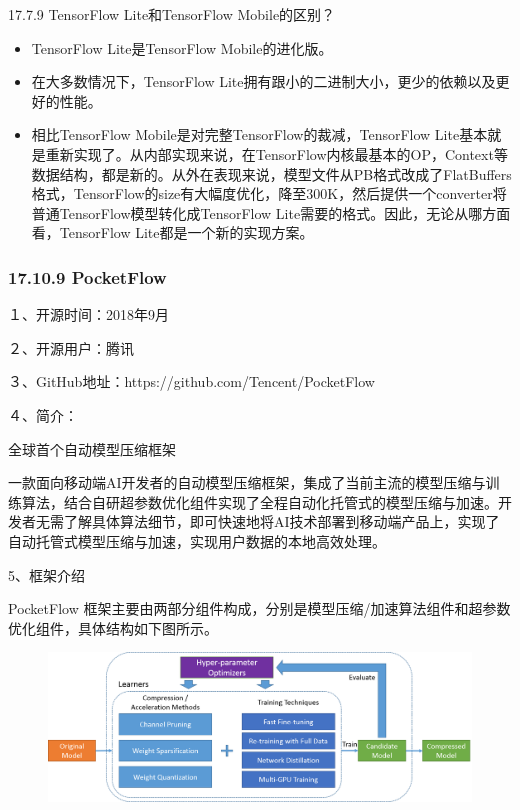 17.7.9 TensorFlow Lite和TensorFlow Mobile的区别？

\begin{itemize}
\item
  TensorFlow Lite是TensorFlow Mobile的进化版。
\item
  在大多数情况下，TensorFlow
  Lite拥有跟小的二进制大小，更少的依赖以及更好的性能。
\item
  相比TensorFlow Mobile是对完整TensorFlow的裁减，TensorFlow
  Lite基本就是重新实现了。从内部实现来说，在TensorFlow内核最基本的OP，Context等数据结构，都是新的。从外在表现来说，模型文件从PB格式改成了FlatBuffers格式，TensorFlow的size有大幅度优化，降至300K，然后提供一个converter将普通TensorFlow模型转化成TensorFlow
  Lite需要的格式。因此，无论从哪方面看，TensorFlow
  Lite都是一个新的实现方案。
\end{itemize}

\subsubsection{17.10.9 PocketFlow}\label{pocketflow}

１、开源时间：2018年9月　　　

２、开源用户：腾讯　　　

３、GitHub地址：https://github.com/Tencent/PocketFlow

４、简介：

全球首个自动模型压缩框架

一款面向移动端AI开发者的自动模型压缩框架，集成了当前主流的模型压缩与训练算法，结合自研超参数优化组件实现了全程自动化托管式的模型压缩与加速。开发者无需了解具体算法细节，即可快速地将AI技术部署到移动端产品上，实现了自动托管式模型压缩与加速，实现用户数据的本地高效处理。

5、框架介绍

PocketFlow
框架主要由两部分组件构成，分别是模型压缩/加速算法组件和超参数优化组件，具体结构如下图所示。

\begin{figure}
\centering
\includegraphics{./img/ch17/framework_design.png}
\caption{}
\end{figure}

